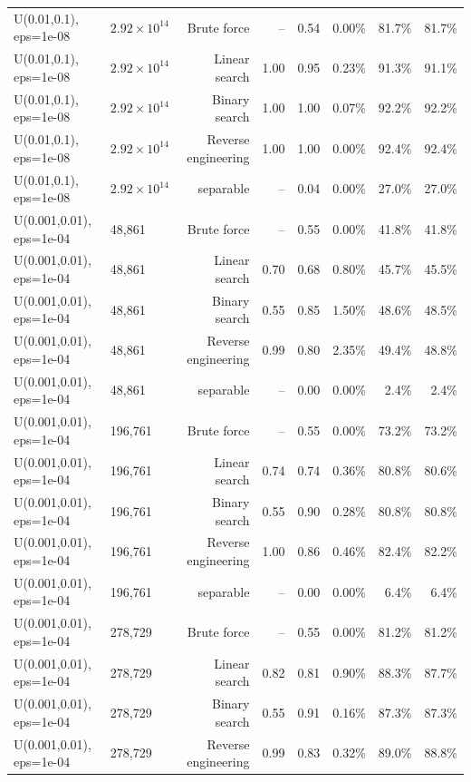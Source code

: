 \begin{tabular}{llrrrrrr}
U(0.01,0.1), eps=1e-08 & $2.92\times 10^{14}$ & Brute force & -- & 0.54 & 0.00\% & 81.7\% & 81.7\% \\
U(0.01,0.1), eps=1e-08 & $2.92\times 10^{14}$ & Linear search & 1.00 & 0.95 & 0.23\% & 91.3\% & 91.1\% \\
U(0.01,0.1), eps=1e-08 & $2.92\times 10^{14}$ & Binary search & 1.00 & 1.00 & 0.07\% & 92.2\% & 92.2\% \\
U(0.01,0.1), eps=1e-08 & $2.92\times 10^{14}$ & Reverse engineering & 1.00 & 1.00 & 0.00\% & 92.4\% & 92.4\% \\
U(0.01,0.1), eps=1e-08 & $2.92\times 10^{14}$ & separable & -- & 0.04 & 0.00\% & 27.0\% & 27.0\% \\
U(0.001,0.01), eps=1e-04 & 48,861 & Brute force & -- & 0.55 & 0.00\% & 41.8\% & 41.8\% \\
U(0.001,0.01), eps=1e-04 & 48,861 & Linear search & 0.70 & 0.68 & 0.80\% & 45.7\% & 45.5\% \\
U(0.001,0.01), eps=1e-04 & 48,861 & Binary search & 0.55 & 0.85 & 1.50\% & 48.6\% & 48.5\% \\
U(0.001,0.01), eps=1e-04 & 48,861 & Reverse engineering & 0.99 & 0.80 & 2.35\% & 49.4\% & 48.8\% \\
U(0.001,0.01), eps=1e-04 & 48,861 & separable & -- & 0.00 & 0.00\% & 2.4\% & 2.4\% \\
U(0.001,0.01), eps=1e-04 & 196,761 & Brute force & -- & 0.55 & 0.00\% & 73.2\% & 73.2\% \\
U(0.001,0.01), eps=1e-04 & 196,761 & Linear search & 0.74 & 0.74 & 0.36\% & 80.8\% & 80.6\% \\
U(0.001,0.01), eps=1e-04 & 196,761 & Binary search & 0.55 & 0.90 & 0.28\% & 80.8\% & 80.8\% \\
U(0.001,0.01), eps=1e-04 & 196,761 & Reverse engineering & 1.00 & 0.86 & 0.46\% & 82.4\% & 82.2\% \\
U(0.001,0.01), eps=1e-04 & 196,761 & separable & -- & 0.00 & 0.00\% & 6.4\% & 6.4\% \\
U(0.001,0.01), eps=1e-04 & 278,729 & Brute force & -- & 0.55 & 0.00\% & 81.2\% & 81.2\% \\
U(0.001,0.01), eps=1e-04 & 278,729 & Linear search & 0.82 & 0.81 & 0.90\% & 88.3\% & 87.7\% \\
U(0.001,0.01), eps=1e-04 & 278,729 & Binary search & 0.55 & 0.91 & 0.16\% & 87.3\% & 87.3\% \\
U(0.001,0.01), eps=1e-04 & 278,729 & Reverse engineering & 0.99 & 0.83 & 0.32\% & 89.0\% & 88.8\% \\

\end{tabular}
